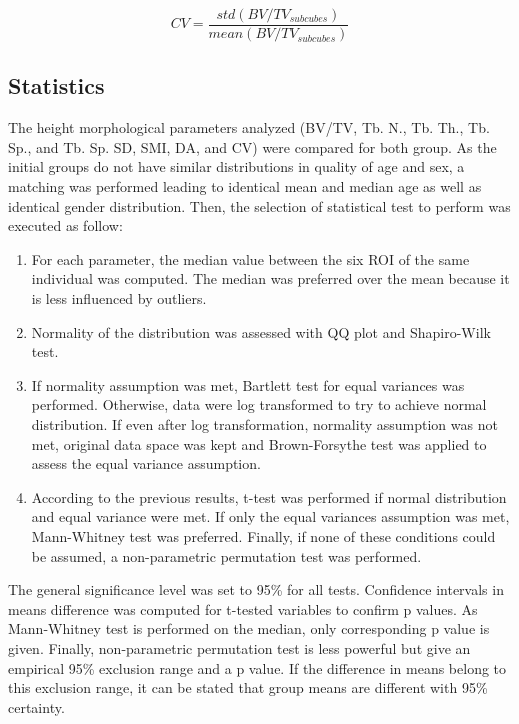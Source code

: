 \documentclass[a4paper,fleqn]{DC_ArtStyle}
\begin{document}
\begin{equation}
	CV = \frac{std(BV/TV_{subcubes})}{mean(BV/TV_{subcubes})}
	\label{Eq203}
\end{equation}

\subsection{Statistics}
The height morphological parameters analyzed (BV/TV, Tb. N., Tb. Th., Tb. Sp., and Tb. Sp. SD, SMI, DA, and CV) were compared for both group. As the initial groups do not have similar distributions in quality of age and sex, a matching was performed leading to identical mean and median age as well as identical gender distribution. Then, the selection of statistical test to perform was executed as follow:
\begin{enumerate}
	\item For each parameter, the median value between the six ROI of the same individual was computed. The median was preferred over the mean because it is less influenced by outliers.
	\item Normality of the distribution was assessed with QQ plot and Shapiro-Wilk test.
	\item If normality assumption was met, Bartlett test for equal variances was performed. Otherwise, data were log transformed to try to achieve normal distribution. If even after log transformation, normality assumption was not met, original data space was kept and Brown-Forsythe test was applied to assess the equal variance assumption.
	\item According to the previous results, t-test was performed if normal distribution and equal variance were met. If only the equal variances assumption was met, Mann-Whitney test was preferred. Finally, if none of these conditions could be assumed, a non-parametric permutation test was performed.
\end{enumerate}
The general significance level was set to 95\% for all tests. Confidence intervals in means difference was computed for t-tested variables to confirm p values. As Mann-Whitney test is performed on the median, only corresponding p value is given. Finally, non-parametric permutation test is less powerful but give an empirical 95\% exclusion range and a p value. If the difference in means belong to this exclusion range, it can be stated that group means are different with 95\% certainty.
\end{document}
